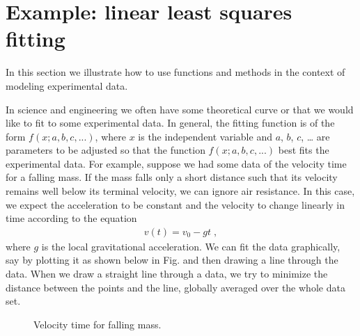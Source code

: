 \documentclass[letterpaper,10pt,english]{sphinxmanual}
\begin{document}
\section{Example: linear least squares fitting}
\label{\detokenize{chap7/chap7_funcs:example-linear-least-squares-fitting}}\label{\detokenize{chap7/chap7_funcs:linfitfunc}}\label{\detokenize{chap7/chap7_funcs:index-5}}
\sphinxAtStartPar
In this section we illustrate how to use functions and methods in the context of modeling experimental data.

\sphinxAtStartPar
In science and engineering we often have some theoretical curve or  that we would like to fit to some experimental data.  In general, the fitting function is of the form \(f(x; a, b, c, ...)\), where \(x\) is the independent variable and \(a\), \(b\), \(c\), … are parameters to be adjusted so that the function \(f(x; a, b, c, ...)\) best fits the experimental data.  For example, suppose we had some data of the velocity  time for a falling mass.  If the mass falls only a short distance such that its velocity remains well below its terminal velocity, we can ignore air resistance.  In this case, we expect the acceleration to be constant and the velocity to change linearly in time according to the equation
\begin{equation}\label{equation:chap7/chap7_funcs:eq:veltime}
\begin{split}v(t) = v_{0} - g t \;,\end{split}
\end{equation}
\sphinxAtStartPar
where \(g\) is the local gravitational acceleration.  We can fit the data graphically, say by plotting it as shown below in Fig. {\hyperref[\detokenize{chap7/chap7_funcs:fig-fallingmassdataplot}]{}} and then drawing a line through the data.  When we draw a straight line through a data, we try to minimize the distance between the points and the line, globally averaged over the whole data set.

\begin{figure}[htbp]
\centering
\capstart

\noindent{}
\caption{Velocity  time for falling mass.}\label{\detokenize{chap7/chap7_funcs:id2}}\label{\detokenize{chap7/chap7_funcs:fig-fallingmassdataplot}}\end{figure}
\end{document}
